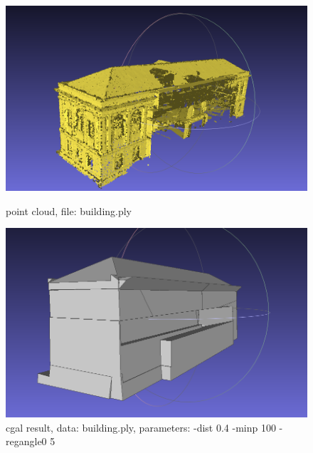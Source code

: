 \documentclass{article}
\begin{document}
\vspace{0.5cm}
\begin{figure}[H]
  \centering
  \begin{minipage}[t]{0.29\textwidth}
  \includegraphics[width=\textwidth]{../../images/screen_kinetic/building_point.png}
  \caption*{point cloud,\newline
  file: building.ply}
\end{minipage}
  \begin{minipage}[t]{0.29\textwidth}
  \includegraphics[width=\textwidth]{../../images/screen_kinetic/building_cgal.png}
  \caption*{cgal result,\newline
  data: building.ply, 
  \newline parameters: -dist 0.4 \newline-minp 100 -regangle0 5}
\end{minipage}
\hspace{0.05\textwidth}
  \begin{minipage}[t]{0.29\textwidth}

\end{minipage}
\end{figure}
\end{document}

